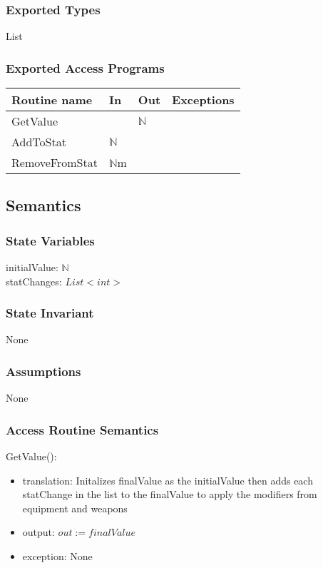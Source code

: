 \documentclass[12pt]{article}
\begin{document}
\subsubsection* {Exported Types}

List

\subsubsection* {Exported Access Programs}

\begin{tabular}{| l | l | l | l |}
\hline
\textbf{Routine name} & \textbf{In} & \textbf{Out} & \textbf{Exceptions}\\
\hline
GetValue & ~ & $\mathbb{N}$  & ~\\
AddToStat & $\mathbb{N}$  & ~ & ~\\
RemoveFromStat & $\mathbb{N}$m  & ~ & ~\\
\hline
\end{tabular}

\subsection* {Semantics}

\subsubsection* {State Variables}

initialValue: $\mathbb{N}$ \\
statChanges: $List<int>$ \\

\subsubsection* {State Invariant}

None

\subsubsection* {Assumptions}

None

\subsubsection* {Access Routine Semantics}

\noindent GetValue():
\begin{itemize}
\item translation: Initalizes finalValue as the initialValue then adds each statChange in the list to the finalValue to apply the modifiers from equipment and weapons
\item output: $out := finalValue$
\item exception: None
\end{itemize}
\end{document}
